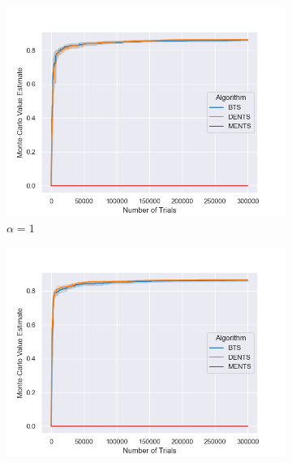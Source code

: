             \FloatBarrier
            
            \begin{figure}
                \centering
                
                \begin{subfigure}[b]{0.32\textwidth}
                    \centering
                    \includegraphics[width=\textwidth]{figures/temp/fl_sens/053_fl8_1_0_01.png}
                    \caption{$\alpha=1$}
                \end{subfigure}
                \begin{subfigure}[b]{0.32\textwidth}
                    \centering
                    \includegraphics[width=\textwidth]{figures/temp/fl_sens/054_fl8_0_5_01.png}

\end{subfigure}
\end{figure}
